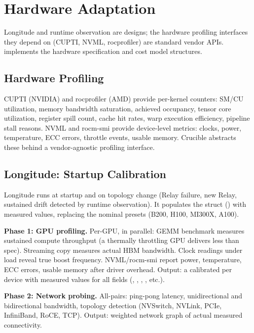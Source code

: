 
\section{Hardware Adaptation}\label{sec:hardware}

Longitude and runtime observation are designs; the hardware profiling interfaces they depend on (CUPTI, NVML, rocprofiler) are standard vendor APIs.
 implements the hardware specification and cost model structures.

\subsection{Hardware Profiling}

CUPTI (NVIDIA) and rocprofiler (AMD) provide per-kernel counters: SM/CU utilization, memory bandwidth saturation, achieved occupancy, tensor core utilization, register spill count, cache hit rates, warp execution efficiency, pipeline stall reasons.
NVML and rocm-smi provide device-level metrics: clocks, power, temperature, ECC errors, throttle events, usable memory.
Crucible abstracts these behind a vendor-agnostic profiling interface.

\subsection{Longitude: Startup Calibration}

Longitude runs at startup and on topology change (Relay failure, new Relay, sustained drift detected by runtime observation).
It populates the  struct () with measured values, replacing the nominal presets (B200, H100, MI300X, A100).

\textbf{Phase 1: GPU profiling.}
Per-GPU, in parallel: GEMM benchmark measures sustained compute throughput (a thermally throttling GPU delivers less than spec).
Streaming copy measures actual HBM bandwidth.
Clock readings under load reveal true boost frequency.
NVML/rocm-smi report power, temperature, ECC errors, usable memory after driver overhead.
Output: a calibrated  per device with measured values for all fields (, , , , etc.).

\textbf{Phase 2: Network probing.}
All-pairs: ping-pong latency, unidirectional and bidirectional bandwidth, topology detection (NVSwitch, NVLink, PCIe, InfiniBand, RoCE, TCP).
Output: weighted network graph of actual measured connectivity.

